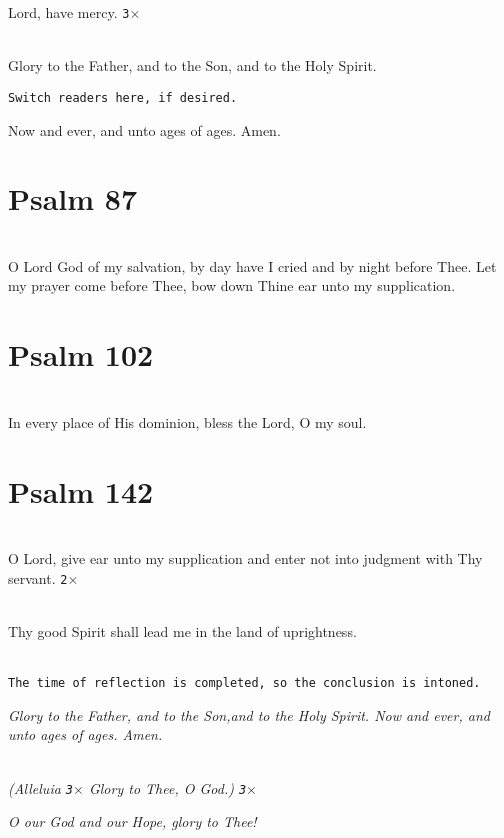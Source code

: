 \documentclass[twoside, twocolumn, 12pt]{report}
\begin{document}
Lord, have mercy. \texttt{3$\times$}

\mbox{}\\
Glory to the Father, and to the Son, and to the Holy Spirit.

\texttt{\scriptsize Switch readers here, if desired.}

Now and ever, and unto ages of ages. Amen.

\section*{Psalm 87}


\mbox{}\\
O Lord God of my salvation, by day have I cried and by night before Thee.
Let my prayer come before Thee, bow down Thine ear unto my supplication.

\section*{Psalm 102}


\mbox{}\\
In every place of His dominion, bless the Lord, O my soul.

\section*{Psalm 142}


\mbox{}\\
O Lord, give ear unto my supplication and enter not into judgment with Thy servant. \texttt{2$\times$}

\mbox{}\\
Thy good Spirit shall lead me in the land of uprightness.

\mbox{}\\
\texttt{\scriptsize The time of reflection is completed,
	so the conclusion is intoned.}

\emph{Glory to the Father, and to the Son,and to the Holy Spirit.
	Now and ever, and unto ages of ages. Amen.}

\mbox{}\\
\emph{(Alleluia \texttt{3$\times$} Glory to Thee, O God.) \texttt{3$\times$}}
	
\emph{O our God and our Hope, glory to Thee!}
\end{document}
